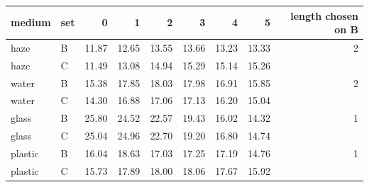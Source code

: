 \begin{tabular}{llrrrrrrr}
\toprule
medium & set & 0 & 1 & 2 & 3 & 4 & 5 & length chosen on B \\
\midrule
haze & B & 11.87 & 12.65 & 13.55 & 13.66 & 13.23 & 13.33 & 2 \\
haze & C & 11.49 & 13.08 & 14.94 & 15.29 & 15.14 & 15.26 &  \\
water & B & 15.38 & 17.85 & 18.03 & 17.98 & 16.91 & 15.85 & 2 \\
water & C & 14.30 & 16.88 & 17.06 & 17.13 & 16.20 & 15.04 &  \\
glass & B & 25.80 & 24.52 & 22.57 & 19.43 & 16.02 & 14.32 & 1 \\
glass & C & 25.04 & 24.96 & 22.70 & 19.20 & 16.80 & 14.74 &  \\
plastic & B & 16.04 & 18.63 & 17.03 & 17.25 & 17.19 & 14.76 & 1 \\
plastic & C & 15.73 & 17.89 & 18.00 & 18.06 & 17.67 & 15.92 &  \\
\bottomrule
\end{tabular}
